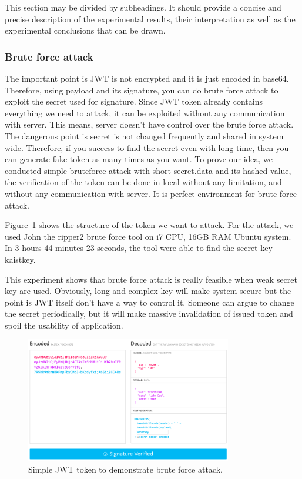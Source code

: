\documentclass[journal,article,submit,moreauthors,pdftex,10pt,a4paper]{mdpi}
\begin{document}
This section may be divided by subheadings. It should provide a concise and precise description of the experimental results, their interpretation as well as the experimental conclusions that can be drawn.

\subsubsection{Brute force attack}

The important point is JWT is not encrypted and it is just encoded in base64. Therefore, using payload and its signature, you can do brute force attack to exploit the secret used for signature. Since JWT token already contains everything we need to attack, it can be exploited without any communication with server. This means, server doesn't have control over the brute force attack. The dangerous point is secret is not changed frequently and shared in system wide. Therefore, if you success to find the secret even with long time, then you can generate fake token as many times as you want. To prove our idea, we conducted simple bruteforce attack with short secret.data and its hashed value, the verification of the token can be done in local without any limitation, and without any communication with server. It is perfect environment for brute force attack.

Figure~\ref{bruteforce} shows the structure of the token we want to attack. For the attack, we used John the ripper2 brute force tool on i7 CPU, 16GB RAM Ubuntu system. In 3 hours 44 minutes 23 seconds, the tool were able to find the secret key kaistkey.

This experiment shows that brute force attack is really feasible when weak secret key are used. Obviously, long and complex key will make system secure but the point is JWT itself don't have a way to control it. Someone can argue to change the secret periodically, but it will make massive invalidation of issued token and spoil the usability of application.
\begin{figure}[H]
\centering
\includegraphics[width=9cm]{figures/bruteforce}
\caption{Simple JWT token to demonstrate brute force attack.}
\label{bruteforce}
\end{figure}
\end{document}
